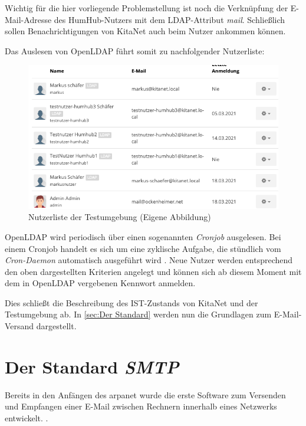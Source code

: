 Wichtig für die hier vorliegende Problemstellung ist noch die Verknüpfung der E-Mail-Adresse des HumHub-Nutzers mit dem LDAP-Attribut \textit{mail}. Schließlich sollen Benachrichtigungen von KitaNet auch beim Nutzer ankommen können. 

Das Auslesen von OpenLDAP führt somit zu nachfolgender Nutzerliste:

\begin{figure}[h]
  \centering
  \includegraphics[width=1.0\textwidth]{res/nutzerliste.png}
  \caption{Nutzerliste der Testumgebung (Eigene Abbildung)}
  \label{fig:Nutzerliste}
\end{figure}

OpenLDAP wird periodisch über einen sogenannten \textit{Cronjob} ausgelesen. Bei einem Cronjob handelt es sich um eine zyklische Aufgabe, die \zb stündlich vom \textit{Cron-Daemon} automatisch ausgeführt wird \citep{cronjob}. Neue Nutzer werden entsprechend den oben dargestellten Kriterien angelegt und können sich ab diesem Moment mit dem in OpenLDAP vergebenen Kennwort anmelden.

Dies schließt die Beschreibung des IST-Zustands von KitaNet und der Testumgebung ab. In \autoref{sec:Der Standard} werden nun die Grundlagen zum E-Mail-Versand dargestellt.

\chapter{Der Standard \textit{SMTP}}
\label{sec:Der Standard}
Bereits in den Anfängen des \ac{arpanet} wurde die erste Software zum Versenden und Empfangen einer E-Mail zwischen Rechnern innerhalb eines Netzwerks entwickelt.  \citep[][]{historyinternet}.

